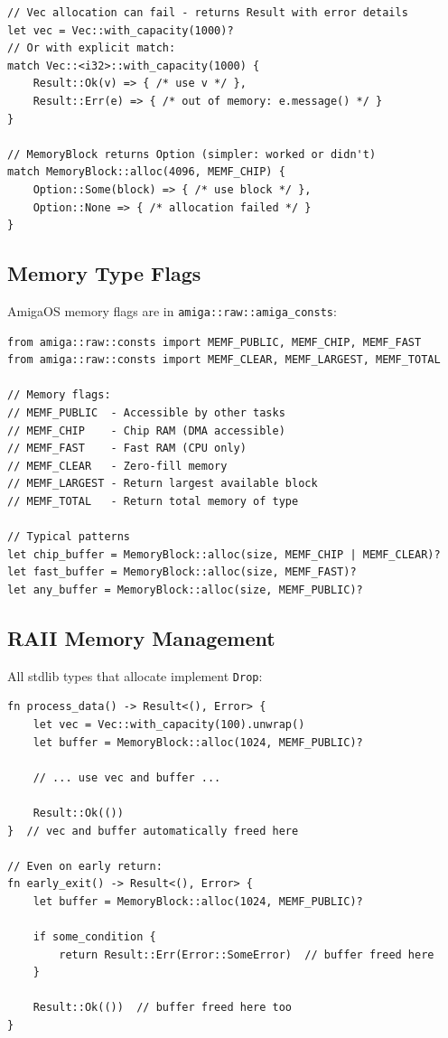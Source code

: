 \begin{lstlisting}
// Vec allocation can fail - returns Result with error details
let vec = Vec::with_capacity(1000)?
// Or with explicit match:
match Vec::<i32>::with_capacity(1000) {
    Result::Ok(v) => { /* use v */ },
    Result::Err(e) => { /* out of memory: e.message() */ }
}

// MemoryBlock returns Option (simpler: worked or didn't)
match MemoryBlock::alloc(4096, MEMF_CHIP) {
    Option::Some(block) => { /* use block */ },
    Option::None => { /* allocation failed */ }
}
\end{lstlisting}

\subsection{Memory Type Flags}

AmigaOS memory flags are in \texttt{amiga::raw::amiga\_consts}:

\begin{lstlisting}
from amiga::raw::consts import MEMF_PUBLIC, MEMF_CHIP, MEMF_FAST
from amiga::raw::consts import MEMF_CLEAR, MEMF_LARGEST, MEMF_TOTAL

// Memory flags:
// MEMF_PUBLIC  - Accessible by other tasks
// MEMF_CHIP    - Chip RAM (DMA accessible)
// MEMF_FAST    - Fast RAM (CPU only)
// MEMF_CLEAR   - Zero-fill memory
// MEMF_LARGEST - Return largest available block
// MEMF_TOTAL   - Return total memory of type

// Typical patterns
let chip_buffer = MemoryBlock::alloc(size, MEMF_CHIP | MEMF_CLEAR)?
let fast_buffer = MemoryBlock::alloc(size, MEMF_FAST)?
let any_buffer = MemoryBlock::alloc(size, MEMF_PUBLIC)?
\end{lstlisting}

\subsection{RAII Memory Management}

All stdlib types that allocate implement \texttt{Drop}:

\begin{lstlisting}
fn process_data() -> Result<(), Error> {
    let vec = Vec::with_capacity(100).unwrap()
    let buffer = MemoryBlock::alloc(1024, MEMF_PUBLIC)?

    // ... use vec and buffer ...

    Result::Ok(())
}  // vec and buffer automatically freed here

// Even on early return:
fn early_exit() -> Result<(), Error> {
    let buffer = MemoryBlock::alloc(1024, MEMF_PUBLIC)?

    if some_condition {
        return Result::Err(Error::SomeError)  // buffer freed here
    }

    Result::Ok(())  // buffer freed here too
}
\end{lstlisting}

